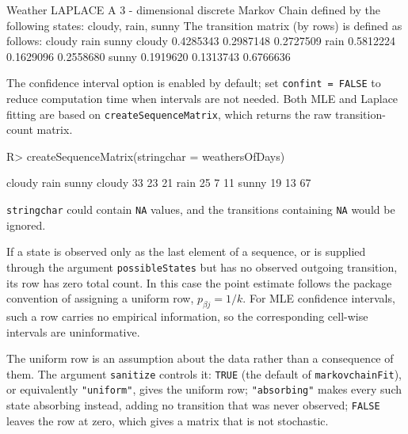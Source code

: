 \documentclass[
  nojss]{jss}
\begin{document}
\begin{CodeChunk}
\begin{CodeOutput}
Weather LAPLACE 
 A  3 - dimensional discrete Markov Chain defined by the following states: 
 cloudy, rain, sunny 
 The transition matrix  (by rows)  is defined as follows: 
          cloudy      rain     sunny
cloudy 0.4285343 0.2987148 0.2727509
rain   0.5812224 0.1629096 0.2558680
sunny  0.1919620 0.1313743 0.6766636
\end{CodeOutput}
\end{CodeChunk}

The confidence interval option is enabled by default; set \texttt{confint\ =\ FALSE} to reduce computation time when intervals are not needed. Both MLE and Laplace fitting are based on \texttt{createSequenceMatrix}, which returns the raw transition-count matrix.

\begin{CodeChunk}
\begin{CodeInput}
R> createSequenceMatrix(stringchar = weathersOfDays)
\end{CodeInput}
\begin{CodeOutput}
       cloudy rain sunny
cloudy     33   23    21
rain       25    7    11
sunny      19   13    67
\end{CodeOutput}
\end{CodeChunk}

\texttt{stringchar} could contain \texttt{NA} values, and the transitions containing \texttt{NA} would be ignored.

If a state is observed only as the last element of a sequence, or is supplied through the argument \texttt{possibleStates} but has no observed outgoing transition, its row has zero total count. In this case the point estimate follows the package convention of assigning a uniform row, \(p_{\beta j}=1/k\). For MLE confidence intervals, such a row carries no empirical information, so the corresponding cell-wise intervals are uninformative.

The uniform row is an assumption about the data rather than a consequence of them. The argument \texttt{sanitize} controls it: \texttt{TRUE} (the default of \texttt{markovchainFit}), or equivalently \texttt{"uniform"}, gives the uniform row; \texttt{"absorbing"} makes every such state absorbing instead, adding no transition that was never observed; \texttt{FALSE} leaves the row at zero, which gives a matrix that is not stochastic.
\end{document}
